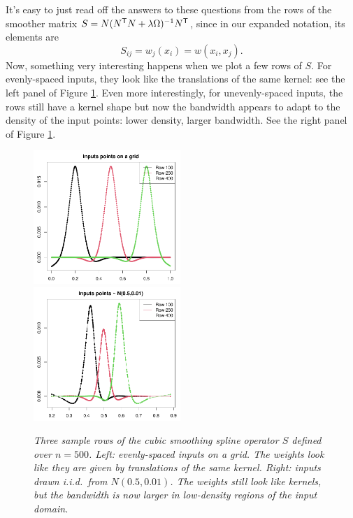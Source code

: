 \documentclass{article}
\begin{document}
It's easy to just read off the answers to these questions from the rows of the
smoother matrix $S = N(N^{\mathsf{T}} N + \lambda \Omega)^{-1} N^{\mathsf{T}}$, since in our
expanded notation, its elements are
\[
S_{ij} = w_j(x_i) = w(x_i, x_j).
\]
Now, something very interesting happens when we plot a few rows of $S$. For
evenly-spaced inputs, they look like the translations of the same kernel: see
the left panel of Figure \ref{fig:ss_kernel}. Even more interestingly, for
unevenly-spaced inputs, the rows still have a kernel shape but now the bandwidth
appears to adapt to the density of the input points: lower density, larger
bandwidth. See the right panel of Figure \ref{fig:ss_kernel}.

\begin{figure}[tb]
\centering
\includegraphics[width=0.495\textwidth]{ss_kernel1.pdf}
\includegraphics[width=0.495\textwidth]{ss_kernel2.pdf}
\caption{\it Three sample rows of the cubic smoothing spline operator $S$
  defined over $n=500$. Left: evenly-spaced inputs on a grid. The weights look
  like they are given by translations of the same kernel. Right: inputs drawn
  i.i.d.\ from $N(0.5, 0.01)$. The weights still look like kernels, but the
  bandwidth is now larger in low-density regions of the input domain.}     
\label{fig:ss_kernel}
\end{figure}
\end{document}
